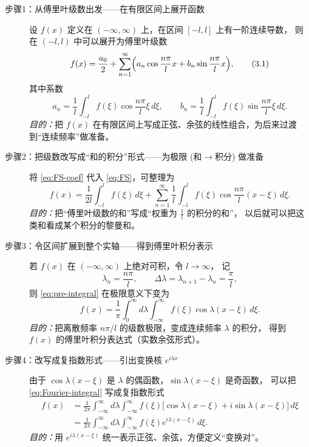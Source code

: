 \begin{description}

  \item[步骤1：从傅里叶级数出发——在有限区间上展开函数]
  设 $f(x)$ 定义在 $(-\infty,\infty)$ 上，在区间 $[-l,l]$ 上有一阶连续导数，
  则在 $(-l,l)$ 中可以展开为傅里叶级数
  \begin{equation}\label{eq:FS}
    f(x)=\frac{a_0}{2}+\sum_{n=1}^{\infty}
        \Bigl(a_n\cos\frac{n\pi}{l}x
             +b_n\sin\frac{n\pi}{l}x\Bigr), \tag{3.1}
  \end{equation}
  其中系数
  \begin{equation}\label{eq:FS-coef}
    a_n=\frac{1}{l}\int_{-l}^{l}f(\xi)\cos\frac{n\pi}{l}\xi\,d\xi,\qquad
    b_n=\frac{1}{l}\int_{-l}^{l}f(\xi)\sin\frac{n\pi}{l}\xi\,d\xi. \tag{3.2}
  \end{equation}
  \emph{目的：}把 $f(x)$ 在有限区间上写成正弦、余弦的线性组合，为后来过渡到“连续频率”做准备。

  \item[步骤2：把级数改写成“和的积分”形式——为极限 (和$\to$积分) 做准备]
  将 \eqref{eq:FS-coef} 代入 \eqref{eq:FS}，可整理为
  \begin{equation}\label{eq:pre-integral}
    f(x)=\frac{1}{2l}\int_{-l}^{l}f(\xi)\,d\xi
         +\sum_{n=1}^{\infty}\frac{1}{l}\int_{-l}^{l}
           f(\xi)\cos\frac{n\pi}{l}(x-\xi)\,d\xi.
  \end{equation}
  \emph{目的：}把“傅里叶级数的和”写成“权重为 $\frac{1}{l}$ 的积分的和”，
  以后就可以把这类和看成某个积分的黎曼和。

  \item[步骤3：令区间扩展到整个实轴——得到傅里叶积分表示]
  若 $f(x)$ 在 $(-\infty,\infty)$ 上绝对可积，令 $l\to\infty$，
  记
  \[
    \lambda_n=\frac{n\pi}{l},\qquad
    \Delta\lambda=\lambda_{n+1}-\lambda_n=\frac{\pi}{l},
  \]
  则 \eqref{eq:pre-integral} 在极限意义下变为
  \begin{equation}\label{eq:Fourier-integral}
    f(x)=\frac{1}{\pi}\int_{0}^{\infty} d\lambda
         \int_{-\infty}^{\infty} f(\xi)\cos\lambda(x-\xi)\,d\xi. \tag{3.3}
  \end{equation}
  \emph{目的：}把离散频率 $n\pi/l$ 的级数极限，变成连续频率 $\lambda$ 的积分，
  得到 $f(x)$ 的傅里叶积分表达式（实数余弦形式）。

  \item[步骤4：改写成复指数形式——引出变换核 $e^{i\lambda x}$]
  由于 $\cos\lambda(x-\xi)$ 是 $\lambda$ 的偶函数，$\sin\lambda(x-\xi)$ 是奇函数，
  可以把 \eqref{eq:Fourier-integral} 写成复指数形式
  \begin{equation}\label{eq:complex-form}
  \begin{aligned}
    f(x)
      &=\frac{1}{2\pi}\int_{-\infty}^{\infty} d\lambda
        \int_{-\infty}^{\infty} f(\xi)
           \bigl[\cos\lambda(x-\xi)+i\sin\lambda(x-\xi)\bigr]\,d\xi \\
      &=\frac{1}{2\pi}\int_{-\infty}^{\infty} d\lambda
        \int_{-\infty}^{\infty} f(\xi)e^{i\lambda(x-\xi)}\,d\xi. \tag{3.4}
  \end{aligned}
  \end{equation}
  \emph{目的：}用 $e^{i\lambda(x-\xi)}$ 统一表示正弦、余弦，方便定义“变换对”。


\end{description}
